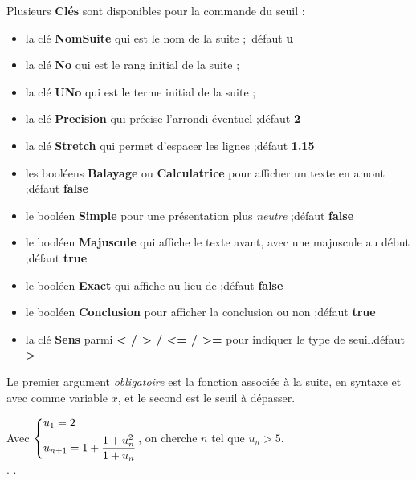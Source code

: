 \documentclass[a4paper,french,11pt]{article}
\newcommand\ctex[1]{\tcbox[vignettelatex]{#1}}
\newcommand\Cle[1]{{\bfseries\sffamily\textlangle \textcolor{orange!75!black}{#1}\textrangle}}
\begin{document}
\begin{cautionblock}
Plusieurs \Cle{Clés} sont disponibles pour la commande du seuil :

\begin{itemize}
	\item la clé \Cle{NomSuite} qui est le nom de la suite ;\hfill~défaut \Cle{u}
	\item la clé \Cle{No} qui est le rang initial de la suite ;
	\item la clé \Cle{UNo} qui est le terme initial de la suite ;
	\item la clé \Cle{Precision} qui précise l'arrondi éventuel ;\hfill{}défaut \Cle{2}
	\item la clé \Cle{Stretch} qui permet d'espacer les lignes ;\hfill{}défaut \Cle{1.15}
	\item les booléens \Cle{Balayage} ou \Cle{Calculatrice} pour afficher un texte en amont ;\hfill{}défaut \Cle{false}
	\item le booléen \Cle{Simple} pour une présentation plus \textit{neutre} ;\hfill{}défaut \Cle{false}
	\item le booléen \Cle{Majuscule} qui affiche le texte avant, avec une majuscule au début ;\hfill{}défaut \Cle{true}
	\item le booléen \Cle{Exact} qui affiche \ctex{=} au lieu de \ctex{\textbackslash approx} ;\hfill{}défaut \Cle{false}
	\item le booléen \Cle{Conclusion} pour afficher la conclusion ou non ;\hfill{}défaut \Cle{true}
	\item la clé \Cle{Sens} parmi \Cle{< / > / <= / >=} pour indiquer le type de seuil.\hfill{}défaut \Cle{>}
\end{itemize}

\smallskip

Le premier argument \textit{obligatoire} est la fonction associée à la suite, en syntaxe \ctex{xint} et avec comme variable $x$, et le second est le seuil à dépasser.
\end{cautionblock}

\begin{PresCodePL}{}
Avec $\begin{dcases} u_1 = 2 \\ u_{n+1}=1+\dfrac{1+u_n^2}{1+u_n} \end{dcases}$,
on cherche $n$ tel que $u_n > 5$.\\
. .
\end{PresCodePL}
\end{document}

